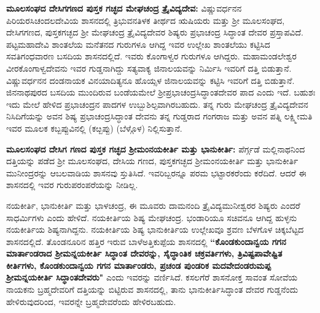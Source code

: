 \textbf{ಮೂಲಸಂಘದ ದೇಸಿಗಗಣದ ಪುಸ್ತಕ ಗಚ್ಛದ ಮೇಘಚಂದ್ರ ತ್ರೈವಿದ್ಯದೇವ:} ವಿಷ್ಣುವರ್ಧನನ ಪಿರಿಯರಸಿ\break ಚಂದಲದೇವಿಯ ಶಾಸನದಲ್ಲಿ ತ್ರಿಭುವನತಿಳಕ ತೀರ್ಥದ ಋಷಿಯರು ಮತ್ತು ಶ‍್ರೀ ಮೂಲಸಂಘದ, ದೇಸಿಗಗಣದ, ಪುಸ್ತಕಗಚ್ಛದ ಶ‍್ರೀ ಮೇಘಚಂದ್ರ ತ್ರೈವಿದ್ಯದೇವರ ಶಿಷ್ಯರು ಪ್ರಭಾಚಂದ್ರ ಸಿದ್ಧಾಂತ ದೇವರ ಪ್ರಸ್ತಾಪವಿದೆ. ಪಟ್ಟಮಹಾದೇವಿ ಶಾಂತಲೆಯ ಮನೆತನದ ಗುರುಗಳೂ ಆಗಿದ್ದ ಇವರ ಉಲ್ಲೇಖ ಶಾಂತಲೆಯು ಕಟ್ಟಿಸಿದ ಸವತಿಗಂಧವಾರಣ ಬಸದಿಯ ಶಾಸನದಲ್ಲಿದೆ. ಇವರು ಕೊಂಗಾಳ್ವರ ಗುರುಗಳೂ ಆಗಿದ್ದರು. ಮಹಾಮಂಡಲೇಶ್ವರ ವೀರಕೊಂಗಾಳ್ವದೇವನು ಇವರ ಗುಡ್ಡನಾಗಿದ್ದು ಸತ್ಯವಾಕ್ಯ ಜಿನಾಲಯವನ್ನು ನಿರ್ಮಿಸಿ ಇವರಿಗೆ ದತ್ತಿ ಬಿಡುತ್ತಾನೆ. ವಿಷ್ಣುವರ್ಧನನ ದಂಡನಾಯಕ ವಿನಯಾದಿತ್ಯನೂ ಹೊಯ್ಸಳ ಜಿನಾಲಯವನ್ನು ಕಟ್ಟಿಸಿ ಇವರಿಗೆ ದತ್ತಿ ಬಿಡುತ್ತಾನೆ. ಜಿನನಾಥಪುರದ ಬಸದಿಯ ಮುಂದಿರುವ ಬಂಡೆಯಮೇಲೆ ಶ‍್ರೀಪ್ರಭಾಚಂದ್ರಸಿದ್ಧಾಂತದೇವರ ಪಾದ ಎಂದು ಇದೆ. ಬಹುಶಃ ಇದು ಮೇಲೆ ಹೇಳಿದ ಪ್ರಭಾಚಂದ್ರನ ಪಾದಗಳ ಉಬ್ಬುಶಿಲ್ಪವಾಗಿರಬಹುದು. ತನ್ನ ಗುರು ಮೇಘಚಂದ್ರ ತ್ರೈವಿದ್ಯದೇವನ ನಿಸಿದಿಗೆಯನ್ನು ಅವನ ಶಿಷ್ಯ ಪ್ರಭಾಚಂದ್ರಸಿದ್ಧಾಂತ ದೇವನು ತನ್ನ ಗುಡ್ಡರಾದ ಗಂಗರಾಜ ಮತ್ತು ಅವನ ಪತ್ನಿ ಲಕ್ಷ್ಮೀಮತಿ ಇವರ ಮೂಲಕ ಕಬ್ಬಪ್ಪುವಿನಲ್ಲಿ (ಕೞ್ಬಪ್ಪು) (ಬೆಳ್ಗೊಳ) ನಿಲ್ಲಿಸುತ್ತಾನೆ.

\vskip 3pt

\textbf{ಮೂಲಸಂಘದ ದೇಸಿಗ ಗಣದ ಪುಸ್ತಕ ಗಚ್ಛದ ಶ‍್ರೀಮಂನಯಕೀರ್ತಿ ಮತ್ತು ಭಾನುಕೀರ್ತಿ:} ಪೆರ್ಗ್ಗಡೆ ಮಲ್ಲಿನಾಥನಿಂದ ದತ್ತಿಯನ್ನು ಪಡೆದ ಶ‍್ರೀ ಮೂಲಸಂಘದ, ದೇಸಿಯ ಗಣದ, ಪುಸ್ತಕಗಚ್ಛದ ಶ‍್ರೀಮಂನಯಕೀರ್ತಿ ಮತ್ತು ಭಾನುಕೀರ್ತಿ ಮುನೀಂದ್ರರನ್ನು ಆಬಲವಾಡಿಯ ಶಾಸನವು ಸ್ತುತಿಸಿದೆ. ಇವರಿಬ್ಬರನ್ನೂ ಪರಮ ಭಟ್ಟಾರಕರೆಂದು ಕರೆದಿದೆ. ಆದರೆ ಈ ಶಾಸನದಲ್ಲಿ ಇವರ ಗುರುಪರಂಪರೆಯನ್ನು ನೀಡಿಲ್ಲ.

\vskip 3pt

ನಯಕೀರ್ತಿ, ಭಾನುಕೀರ್ತಿ ಮತ್ತು ಭಾಳಚಂದ್ರ, ಈ ಮೂವರು ದಾಮನಂದಿ ತ್ರೈವಿದ್ಯಮುನೀಶ್ವರರ ಶಿಷ್ಯರು ಎಂದರೆ ಸಾಧರ್ಮಿಗಳು ಎಂದು ಹೇಳಿದೆ. ನಯಕೀರ್ತಿಯ ಶಿಷ್ಯ ಮೇಘಚಂದ್ರ. ಭಂಡಾರಿಯೂ ಸಚಿವನೂ ಆಗಿದ್ದ ಹುಳ್ಳನು ನಯಕೀರ್ತಿಯ ಶಿಷ್ಯನಾಗಿದ್ದನು. ನಯಕೀರ್ತಿಯ ಶಿಷ್ಯ ಭಾನುಕೀರ್ತಿಯ ಉಲ್ಲೇಖವೂ ಶ್ರವಣ ಬೆಳಗೊಳ ಚಿಕ್ಕಬೆಟ್ಟದ ಶಾಸನದಲ್ಲಿದೆ. ತೊಂಡನೂರಿನ ಹತ್ತಿರ ಇರುವ ಬಾಳೆಅತ್ತಿಕುಪ್ಪೆಯ ಶಾಸನದಲ್ಲಿ \textbf{“ಕೊಂಡಕುಂದಾನ್ವಯ ಗಗನ ಮಾರ್ತಾಂಡರಾದ ಶ‍್ರೀಮನ್ನಯಕೀರ್ತಿ ಸಿದ್ಧಾಂತ ದೇವರನ್ನು, ಸೈದ್ಧಾಂತಿಕ ಚಕ್ರವರ್ತಿಗಳು, ತ್ರಿವಿಷ್ಟಪಾವೇಷ್ಟಿತ ಕೀರ್ತಿಗಳು, ಕೊಂಡಕುಂದಾನ್ವಯ ಗಗನ ಮಾರ್ತಾಂಡರು, ಪ್ರಚಂಡ ಪುಂಡರಿಕ ಮದವೇದಂಡರುಮಪ್ಪ ಶ‍್ರೀಮನ್ನಯಕೀರ್ತಿ ಸಿದ್ಧಾಂತದೇವರು"} ಎಂದು ಇವರನ್ನು ವರ್ಣಿಸಿದೆ. ಕಸಲಗೆರೆ ಶಾಸನೋಕ್ತ ಸಾವಂತ ಸೋವೆಯ ನಾಯಕನು ಬ್ರಹ್ಮದೇವರಿಗೆ ದತ್ತಿಯನ್ನು ಬಿಟ್ಟಿರುವ ಶಾಸನದಲ್ಲಿ, ತಾನು ಭಾನುಕೀರ್ತಿಸಿದ್ಧಾಂತ ದೇವರ ಗುಡ್ಡನೆಂದು ಹೇಳಿರುವುದರಿಂದ, ಇವರನ್ನೇ ಬ್ರಹ್ಮದೇವರೆಂದು ಹೇಳಿರಬಹುದು.

